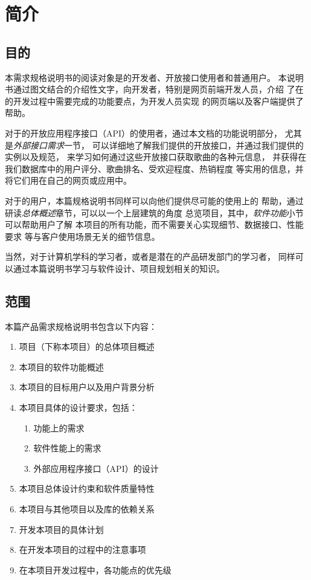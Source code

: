 \chapter{简介}
\section{目的}

本需求规格说明书的阅读对象是\proname 的开发者、开放接口使用者和普通用户。
本说明书通过图文结合的介绍性文字，向开发者，特别是网页前端开发人员，介绍
    了在\proname 的开发过程中需要完成的功能要点，为开发人员实现\proname
    的网页端以及客户端提供了帮助。

对于\proname 的开放应用程序接口（API）的使用者，通过本文档的功能说明部分，
    尤其是\emph{外部接口需求}一节，
    可以详细地了解我们提供的开放接口，并通过我们提供的实例以及规范，
    来学习如何通过这些开放接口获取歌曲的各种元信息，
    并获得在我们数据库中的用户评分、歌曲排名、受欢迎程度、热销程度
    等实用的信息，并将它们用在自己的网页或应用中。

对于\proname 的用户，本篇规格说明书同样可以向他们提供尽可能的使用上的
    帮助，通过研读\emph{总体概述}章节，可以以一个上层建筑的角度
    总览\proname 项目，其中，\emph{软件功能}小节可以帮助用户了解
    本项目的所有功能，而不需要关心实现细节、数据接口、性能要求
    等与客户使用场景无关的细节信息。

当然，对于计算机学科的学习者，或者是潜在的产品研发部门的学习者，
    同样可以通过本篇说明书学习与软件设计、项目规划相关的知识。

\section{范围}

本篇产品需求规格说明书包含以下内容：

\begin{enumerate}
    \item \proname 项目（下称本项目）的总体项目概述
    \item 本项目的软件功能概述
    \item 本项目的目标用户以及用户背景分析
    \item 本项目具体的设计要求，包括：
    \begin{enumerate}
        \item 功能上的需求
        \item 软件性能上的需求
        \item 外部应用程序接口（API）的设计
    \end{enumerate}
    \item 本项目总体设计约束和软件质量特性
    \item 本项目与其他项目以及库的依赖关系
    \item 开发本项目的具体计划
    \item 在开发本项目的过程中的注意事项
    \item 在本项目开发过程中，各功能点的优先级
\end{enumerate}